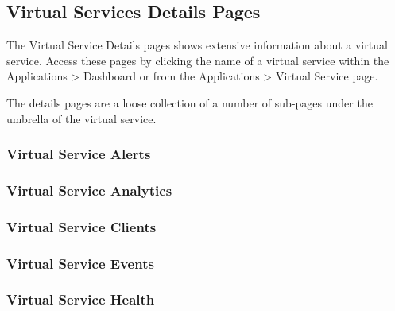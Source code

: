 \documentclass[letterpaper,10pt,english]{sphinxmanual}
\begin{document}
\subsection{Virtual Services Details Pages}
\label{\detokenize{getting_started/virtual_services:virtual-services-details-pages}}
The Virtual Service Details pages shows extensive information about a virtual service. Access these pages by clicking the name of a virtual service within the Applications \textgreater{} Dashboard or from the Applications \textgreater{} Virtual Service page.

The details pages are a loose collection of a number of sub-pages under the umbrella of the virtual service.


\subsubsection{Virtual Service Alerts}
\label{\detokenize{getting_started/virtual_services/alerts::doc}}\label{\detokenize{getting_started/virtual_services/alerts:virtual-service-alerts}}

\subsubsection{Virtual Service Analytics}
\label{\detokenize{getting_started/virtual_services/analytics::doc}}\label{\detokenize{getting_started/virtual_services/analytics:virtual-service-analytics}}

\subsubsection{Virtual Service Clients}
\label{\detokenize{getting_started/virtual_services/clients::doc}}\label{\detokenize{getting_started/virtual_services/clients:virtual-service-clients}}

\subsubsection{Virtual Service Events}
\label{\detokenize{getting_started/virtual_services/events:virtual-service-events}}\label{\detokenize{getting_started/virtual_services/events::doc}}

\subsubsection{Virtual Service Health}
\label{\detokenize{getting_started/virtual_services/health:virtual-service-health}}\label{\detokenize{getting_started/virtual_services/health::doc}}
\end{document}

